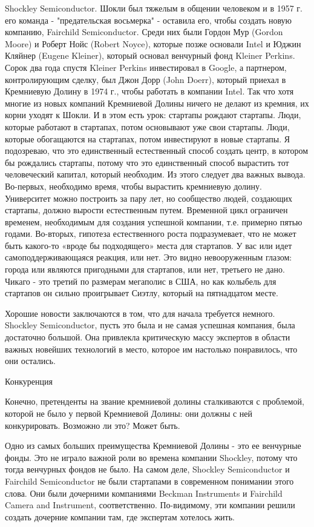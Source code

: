 \documentclass[ebook,12pt,oneside,openany]{memoir}
\begin{document}
Shockley Semiconductor. Шокли был тяжелым в общении человеком и в 1957
г. его команда - "предательская восьмерка" - оставила его, чтобы
создать новую компанию, Fairchild Semiconductor. Среди них были Гордон
Мур (Gordon Moore) и Роберт Нойс (Robert Noyce), которые позже
основали Intel и Юджин Кляйнер (Eugene Kleiner), который основал
венчурный фонд Kleiner Perkins. Сорок два года спустя Kleiner Perkins
инвестировал в Google, а партнером, контролирующим сделку, был Джон
Дорр (John Doerr), который приехал в Кремниевую Долину в 1974 г.,
чтобы работать в компании Intel. Так что хотя многие из новых компаний
Кремниевой Долины ничего не делают из кремния, их корни уходят к
Шокли. И в этом есть урок: стартапы рождают стартапы. Люди, которые
работают в стартапах, потом основывают уже свои стартапы. Люди,
которые обогащаются на стартапах, потом инвестируют в новые стартапы.
Я подозреваю, что это единственный естественный способ создать центр,
в котором бы рождались стартапы, потому что это единственный способ
вырастить тот человеческий капитал, который необходим. Из этого
следует два важных вывода. Во-первых, необходимо время, чтобы
вырастить кремниевую долину. Университет можно построить за пару лет,
но сообщество людей, создающих стартапы, должно вырости естественным
путем. Временной цикл ограничен временем, необходимым для создания
успешной компании, т.е. примерно пятью годами. Во-вторых, гипотеза
естественного роста подразумевает, что не может быть какого-то «вроде
бы подходящего» места для стартапов. У вас или идет
самоподдерживающаяся реакция, или нет. Это видно невооруженным глазом:
города или являются пригодными для стартапов, или нет, третьего не
дано. Чикаго - это третий по размерам мегаполис в США, но как колыбель
для стартапов он сильно проигрывает Сиэтлу, который на пятнадцатом
месте.

Хорошие новости заключаются в том, что для начала требуется немного.
Shockley Semiconductor, пусть это была и не самая успешная компания,
была достаточно большой. Она привлекла критическую массу экспертов в
области важных новейших технологий в место, которое им настолько
понравилось, что они остались.

Конкуренция

Конечно, претенденты на звание кремниевой долины сталкиваются с
проблемой, которой не было у первой Кремниевой Долины: они должны с
ней конкурировать. Возможно ли это? Может быть.

Одно из самых больших преимущества Кремниевой Долины - это ее
венчурные фонды. Это не играло важной роли во времена компании
Shockley, потому что тогда венчурных фондов не было. На самом деле,
Shockley Semiconductor и Fairchild Semiconductor не были стартапами в
современном понимании этого слова. Они были дочерними компаниями
Beckman Instruments и Fairchild Camera and Instrument, соответственно.
По-видимому, эти компании решили создать дочерние компании там, где
экспертам хотелось жить.
\end{document}
